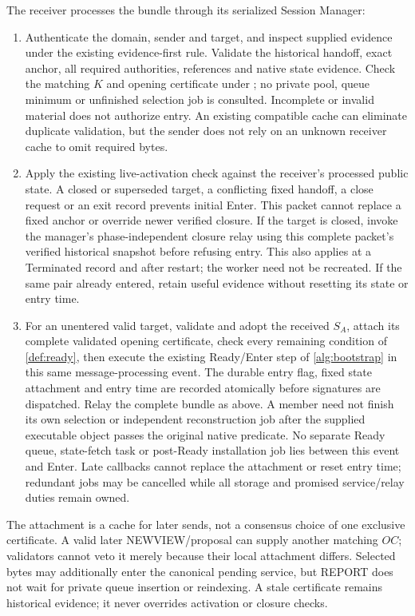 The receiver processes the bundle through its serialized Session Manager:
\begin{enumerate}[label=(\roman*),itemsep=2pt]
\item Authenticate the domain, sender and target, and inspect supplied
evidence under the existing evidence-first rule. Validate the historical
handoff, exact anchor, all required authorities, references and native
state evidence. Check the matching $K$ and opening certificate under
; no private pool, queue minimum or unfinished selection
job is consulted. Incomplete or invalid material does not authorize entry.
An existing compatible cache can eliminate duplicate validation, but the
sender does not rely on an unknown receiver cache to omit required bytes.
\item Apply the existing live-activation check against the receiver's
processed public state. A closed or superseded target, a conflicting fixed
handoff, a close request or an exit record prevents initial Enter. This
packet cannot replace a fixed anchor or override newer verified closure.
If the target is closed, invoke the manager's phase-independent closure
relay using this complete packet's verified historical snapshot before
refusing entry. This also applies at a Terminated record and after restart;
the worker need not be recreated. If the same pair already entered,
retain useful evidence without resetting
its state or entry time.
\item For an unentered valid target, validate and adopt the received
$S_A$, attach its complete validated opening certificate, check every
remaining condition of \cref{def:ready}, then execute
the existing Ready/Enter step of \cref{alg:bootstrap} in this same
message-processing event. The durable entry flag, fixed state attachment
and entry time are recorded atomically before signatures are dispatched.
Relay the complete bundle as above. A member need not finish its own
selection or independent reconstruction job after the supplied executable
object passes the original native predicate. No separate Ready queue,
state-fetch task or post-Ready installation job lies between this event
and Enter. Late callbacks cannot replace the attachment or reset entry
time; redundant jobs may be cancelled while all storage and promised
service/relay duties remain owned.
\end{enumerate}

The attachment is a cache for later sends, not a consensus choice of
one exclusive certificate. A valid later NEWVIEW/proposal can supply
another matching $\mathit{OC}$; validators cannot veto it merely because
their local attachment differs. Selected bytes may additionally enter the
canonical pending service, but REPORT does not wait for private queue
insertion or reindexing. A stale certificate remains historical evidence;
it never overrides activation or closure checks.

